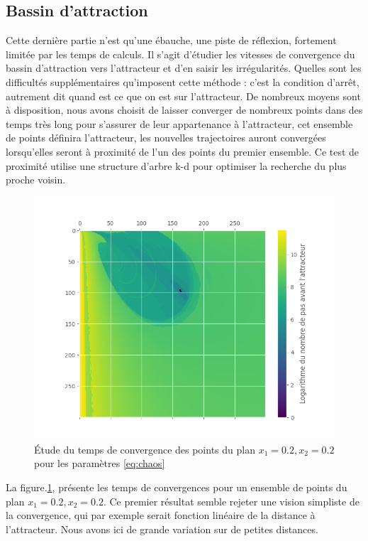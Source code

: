 \documentclass{wsdcr}
\begin{document}
\subsection{Bassin d'attraction}
Cette dernière partie n'est qu'une ébauche, une piste de réflexion, fortement limitée par les temps de calculs. Il s'agit d'étudier les vitesses de convergence du bassin d'attraction vers l'attracteur et d'en saisir les irrégularités. Quelles sont les difficultés supplémentaires qu'imposent cette méthode : c'est la condition d'arrêt, autrement dit quand est ce que on est sur l'attracteur. De nombreux moyens sont à disposition, nous avons choisit de laisser converger de nombreux points dans des temps très long pour s'assurer de leur appartenance à l'attracteur, cet ensemble de points définira l'attracteur, les nouvelles trajectoires auront convergées lorsqu'elles seront à proximité de l'un des points du premier ensemble. Ce test de proximité utilise une structure d'arbre k-d pour optimiser la recherche du plus proche voisin.
\begin{figure}
    \centering
    \includegraphics[width=\linewidth]{fig/lv4_ba.png}
    \caption{Étude du temps de convergence des points du plan $x_1=0.2,x_2=0.2$ pour les paramètres \ref{eq:chaos}}
    \label{fig:ba4}
\end{figure}
La figure.\ref{fig:ba4}, présente les temps de convergences pour un ensemble de points du plan $x_1=0.2,x_2=0.2$. Ce premier résultat semble rejeter une vision simpliste de la convergence, qui par exemple serait fonction linéaire de la distance à l'attracteur. Nous avons ici de grande variation sur de petites distances.
\end{document}
